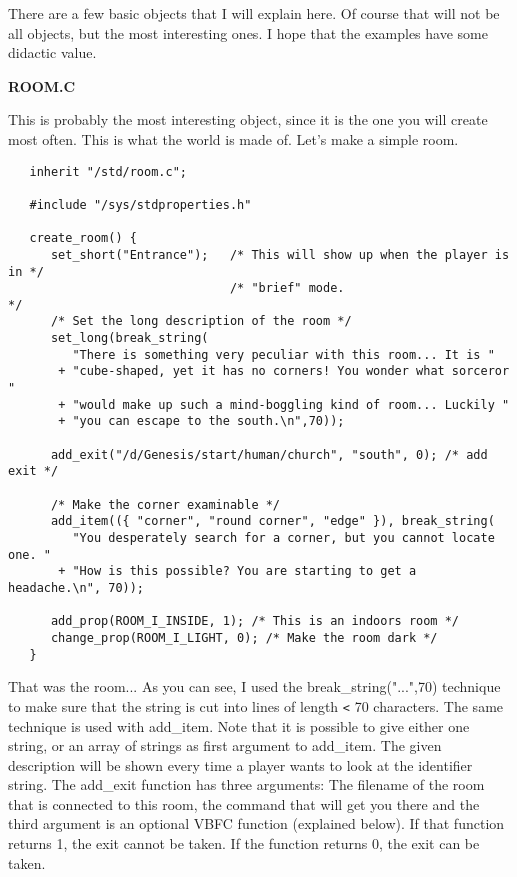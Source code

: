 There are a few basic objects that I will explain here. Of course that will
not be all objects, but the most interesting ones. I hope that the examples
have some didactic value.

{\bf ROOM.C}

This is probably the most interesting object, since it is the one you will
create most often. This is what the world is made of. Let's make a simple
room.

\begin{verbatim}
   inherit "/std/room.c";

   #include "/sys/stdproperties.h"

   create_room() {
      set_short("Entrance");   /* This will show up when the player is in */
                               /* "brief" mode.                           */
      /* Set the long description of the room */
      set_long(break_string(
         "There is something very peculiar with this room... It is "
       + "cube-shaped, yet it has no corners! You wonder what sorceror "
       + "would make up such a mind-boggling kind of room... Luckily "
       + "you can escape to the south.\n",70));

      add_exit("/d/Genesis/start/human/church", "south", 0); /* add exit */

      /* Make the corner examinable */
      add_item(({ "corner", "round corner", "edge" }), break_string(
         "You desperately search for a corner, but you cannot locate one. "
       + "How is this possible? You are starting to get a headache.\n", 70));

      add_prop(ROOM_I_INSIDE, 1); /* This is an indoors room */
      change_prop(ROOM_I_LIGHT, 0); /* Make the room dark */ 
   }
\end{verbatim}

That was the room... As you can see, I used the break\_string("...",70)
technique to make sure that the string is cut into lines of length \verb+<+ 70
characters. The same technique is used with add\_item. Note that it is
possible to give either one string, or an array of strings as first
argument to add\_item. The given description will be shown every time a
player wants to look at the identifier string.
The add\_exit function has three arguments: The filename of the room that is
connected to this room, the command that will get you there and the third
argument is an optional VBFC function (explained below). If that function
returns 1, the exit cannot be taken. If the function returns 0, the exit
can be taken.

